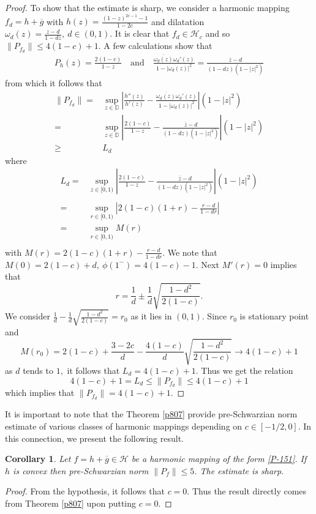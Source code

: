 \documentclass[a4paper,12pt]{amsart}
\newtheorem{cor}{Corollary}[section]
\theoremstyle{definition}
\begin{document}
\begin{proof}
		To show that the estimate is sharp, we consider a harmonic mapping $f_d=h+\overline{g}$ with $h(z)=\frac{(1-z)^{2c-1}-1}{1-2c}$ and dilatation $\omega_d(z)=\frac{z-d}{1-dz},~d\in(0,1).$ It is clear that $f_d\in \mathcal{H}_c$ and so $\|P_{f_d}\|\le 4(1-c)+1.$ A few calculations show that 
		\begin{align}
			P_h(z)=\frac{2(1-c)}{1-z}\quad\text{and}\quad \frac{\overline{\omega_d(z)}\omega_d'(z)}{1-|\omega_d(z)|^2}=\frac{\overline{z}-d}{(1-dz)(1-|z|^2)}
		\end{align}
		from which it follows that 
		\begin{align}
			\|P_{f_d}\|=&\sup_{z \in \mathbb{D}}\left|\frac{h''(z)}{h'(z)}-\frac{\overline{\omega_d(z)}\omega_d'(z)}{1-|\omega_d(z)|^2}\right|(1-|z|^2)\\\nonumber
			=&\sup_{z \in \mathbb{D}}\left|\frac{2(1-c)}{1-z}-\frac{\overline{z}-d}{(1-dz)(1-|z|^2)}\right|(1-|z|^2)\\\nonumber
			\ge & L_d
		\end{align}
		where 
		\begin{align}
			L_d=&\sup_{z \in [0,1)}\left|\frac{2(1-c)}{1-z}-\frac{\overline{z}-d}{(1-dz)(1-|z|^2)}\right|(1-|z|^2)\\\nonumber\\\nonumber
			=&\sup_{r \in [0,1)}\left|2(1-c)(1+r)-\frac{r-d}{1-dr}\right|\\\nonumber
			=&\sup_{r \in [0,1)}M(r)\\\nonumber
		\end{align}
		with $M(r)=2(1-c)(1+r)-\frac{r-d}{1-dr}.$ We note that $M(0)=2(1-c)+d,~\phi(1^-)=4(1-c)-1.$ Next $M'(r)=0$ implies that $$r=\frac{1}{d}\pm\frac{1}{d}\sqrt{\frac{1-d^2}{2(1-c)}}.$$ We consider $\frac{1}{d}-\frac{1}{d}\sqrt{\frac{1-d^2}{2(1-c)}}=r_0$ as it lies in $(0,1).$ Since $r_0$ is stationary point and $$M(r_0)=2(1-c)+\frac{3-2c}{d}-\frac{4(1-c)}{d}\sqrt{\frac{1-d^2}{2(1-c)}}\rightarrow 4(1-c)+1$$ as $d$ tends to $1,$ it follows that $L_d=4(1-c)+1.$ Thus we get the relation $$4(1-c)+1=L_d\le \|P_{f_d}\|\le 4(1-c)+1$$ which implies that $\|P_{f_d}\|=4(1-c)+1.$
	\end{proof}
	It is important to note that the Theorem \ref{p807} provide pre-Schwarzian norm estimate of various classes of harmonic mappings depending on $c\in[-1/2,0].$ In this connection, we present the following result. 
\begin{cor}
	Let $f=h+\overline{g}\in\mathcal{H}$ be a harmonic mapping of the form \eqref{P-151}. If $h$ is convex then pre-Schwarzian norm $\|P_f\|\le 5$. The estimate is sharp. 
\end{cor}
	\begin{proof}
	From the hypothesis, it follows that $c=0.$ Thus the result directly comes from Theorem \ref{p807} upon putting $c=0$.
	\end{proof}
	
\end{document}
